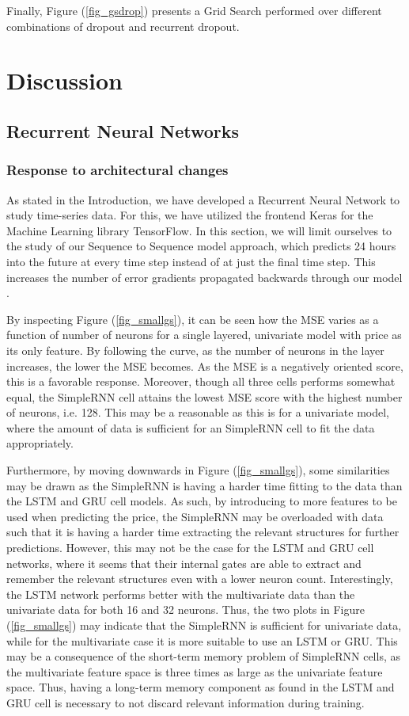 \documentclass
[twocolumn,
secnumarabic,
nobibnotes,
aps,
prl,
reprint,
groupedaddress,
amsmath,
amssymb,
]{revtex4-2}
\begin{document}
Finally, Figure (\ref{fig_gsdrop}) presents a Grid Search performed over different combinations of dropout and recurrent dropout. 


\section{Discussion}

\subsection{Recurrent Neural Networks}


\subsubsection{Response to architectural changes}
As stated in the Introduction, we have developed a Recurrent Neural Network to study time-series data. For this, we have utilized the frontend Keras for the Machine Learning library TensorFlow. In this section, we will limit ourselves to the study of our Sequence to Sequence model approach, which predicts 24 hours into the future at every time step instead of at just the final time step. This increases the number of error gradients propagated backwards through our model \cite{Geron2019}. 

By inspecting Figure (\ref{fig_smallgs}), it can be seen how the MSE varies as a function of number of neurons for a single layered, univariate model with price as its only feature. By following the curve, as the number of neurons in the layer increases, the lower the MSE becomes. As the MSE is a negatively oriented score, this is a favorable response. Moreover, though all three cells performs somewhat equal, the SimpleRNN cell attains the lowest MSE score with the highest number of neurons, i.e. 128. This may be a reasonable as this is for a univariate model, where the amount of data is sufficient for an SimpleRNN cell to fit the data appropriately. 

Furthermore, by moving downwards in Figure (\ref{fig_smallgs}), some similarities may be drawn as the SimpleRNN is having a harder time fitting to the data than the LSTM and GRU cell models. As such, by introducing to more features to be used when predicting the price, the SimpleRNN may be overloaded with data such that it is having a harder time extracting the relevant structures for further predictions. However, this may not be the case for the LSTM and GRU cell networks, where it seems that their internal gates are able to extract and remember the relevant structures even with a lower neuron count. Interestingly, the LSTM network performs better with the multivariate data than the univariate data for both 16 and 32 neurons. Thus, the two plots in Figure (\ref{fig_smallgs}) may indicate that the SimpleRNN is sufficient for univariate data, while for the multivariate case it is more suitable to use an LSTM or GRU. This may be a consequence of the short-term memory problem of SimpleRNN cells, as the multivariate feature space is three times as large as the univariate feature space. Thus, having a long-term memory component as found in the LSTM and GRU cell is necessary to not discard relevant information during training.
\end{document}
